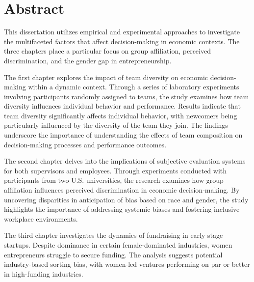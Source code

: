 
% 
\thispagestyle{empty} %
\doublespacing

\section*{\centering Abstract}


This dissertation utilizes empirical and experimental approaches to investigate the multifaceted factors that affect decision-making in economic contexts. The three chapters place a particular focus on group affiliation, perceived discrimination, and the gender gap in entrepreneurship.

The first chapter explores the impact of team diversity on economic decision-making within a dynamic context. Through a series of laboratory experiments involving participants randomly assigned to teams, the study examines how team diversity influences individual behavior and performance. Results indicate that team diversity significantly affects individual behavior, with newcomers being particularly influenced by the diversity of the team they join. The findings underscore the importance of understanding the effects of team composition on decision-making processes and performance outcomes. 

The second chapter delves into the implications of subjective evaluation systems for both supervisors and employees. Through experiments conducted with participants from two U.S. universities, the research examines how group affiliation influences perceived discrimination in economic decision-making. By uncovering disparities in anticipation of bias based on race and gender, the study highlights the importance of addressing systemic biases and fostering inclusive workplace environments.


The third chapter investigates the dynamics of fundraising in early stage startups. Despite dominance in certain female-dominated industries, women entrepreneurs struggle to secure funding. The analysis suggests potential industry-based sorting bias, with women-led ventures performing on par or better in high-funding industries.


